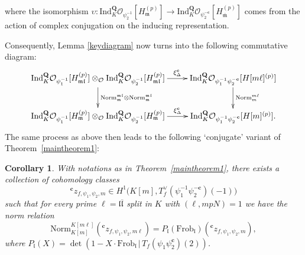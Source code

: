 \documentclass[10pt,letterpaper]{amsart}
\theoremstyle{plain}
\theoremstyle{definition}
\theoremstyle{definition}
\theoremstyle{plain}
\theoremstyle{plain}
\theoremstyle{plain}
\newtheorem{cor}[thm]{Corollary}
\theoremstyle{remark}
\numberwithin{equation}{section}
\newcommand{\cc}{\mathbf{c}}
\newcommand{\fkm}{\mathfrak{m}}
\newcommand{\fkmbar}{\overline{\mathfrak{m}}}
\newcommand{\fkf}{\mathfrak{f}}
\newcommand{\fkfbar}{\overline{\mathfrak{f}}}
\newcommand{\fkl}{\mathfrak{l}}
\newcommand{\fklbar}{\overline{\mathfrak{l}}}
\def\cO{\mathcal O}
\newcommand{\Q}{\mathbf{Q}}
\begin{document}
where the isomorphism $\upsilon: \text{Ind}^{\Q}_{K}\mathcal{O}_{\psi_{2}^{-1}}[H_{\fkm}^{(p)}] \rightarrow\text{Ind}^{\Q}_{K}\mathcal{O}_{\psi_{2}^{-\cc}}[H_{\fkmbar}^{(p)}]  $ comes from the action of complex conjugation on the inducing representation.

Consequently, Lemma \ref{keydiagram} now turns into
the following commutative diagram:
\begin{equation}\label{keydiagram_complex_conjugate}
   \begin{aligned}
        \xymatrix{
 {\mathrm{Ind}}^{\Q}_{K}\mathcal{O}_{\psi_{1}^{-1}}[H_{\fkm\fkl}^{(p)}]\otimes_{\mathcal{O}}{\mathrm{Ind}}^{\Q}_{K}\mathcal{O}_{\psi_{2}^{-1}}[H_{\fkm\fkl}^{(p)}] \ar[d]^{\mathrm{Norm}^{\fkm\fkl}_{\fkm}\otimes\mathrm{Norm}^{\fkm\fkl}_{\fkm}} \ar[r]^-{\xi_{\Delta}^{\cc}} &{\mathrm{Ind}}^{\Q}_{K}\mathcal{O}_{\psi_{1}^{-1}\psi_{2}^{-\cc}}[H[m\ell]^{(p)}] \ar[d]^{\mathrm{Norm}^{m\ell}_{m}} \\
{\mathrm{Ind}}^{\Q}_{K}\mathcal{O}_{\psi_{1}^{-1}}[H_{\fkm}^{(p)}]\otimes_{\mathcal{O}}{\mathrm{Ind}}^{\Q}_{K}\mathcal{O}_{\psi_{2}^{-1}}[H_{\fkm}^{(p)}] \ar[r]^-{\xi_{\Delta}^{\cc}} & {\mathrm{Ind}}^{\Q}_{K}\mathcal{O}_{\psi_{1}^{-1}\psi_{2}^{-\cc}}[H[m]^{(p)}].}
   \end{aligned}
\end{equation}
The same process as above then leads to the following `conjugate' variant of Theorem~\ref{maintheorem1}:

\begin{cor}\label{maincor1}
With notations as in Theorem~\ref{maintheorem1}, there exists a collection of cohomology classes
\[
{}^\cc{z}_{f,\psi_1,\psi_2,m}\in H^1\bigl(K[m],T_f^{\vee}(\psi_{1}^{-1}\psi_{2}^{-\cc})(-1)\bigr)
\]
such that for every prime $\ell=\fkl\fklbar$ split in $K$ with $(\ell,mpN)=1$ we have the norm relation
\begin{equation*}
    \mathrm{Norm}_{K[m]}^{K[m\ell]}({}^\cc{z}_{f,\psi_1,\psi_2,m\ell})=P_{\fkl}(\mathrm{Frob}_{\fkl})({}^\cc{z}_{f,\psi_1,\psi_2,m}),
\end{equation*}
where $P_{\fkl}(X)=\det(1-X\cdot \mathrm{Frob}_{\fkl}\,|\,T_f(\psi_1\psi_2^\cc)(2))$.
\end{cor}
\end{document}
